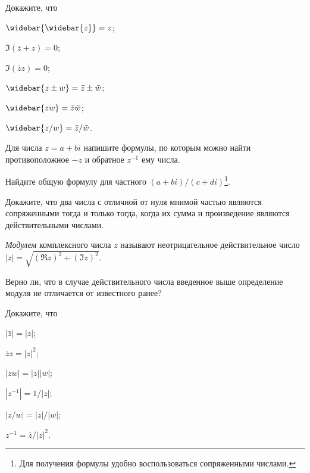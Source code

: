\documentclass[a4paper, 12pt, num=21, date=02.09.2019]{listok}
\begin{document}
\begin{problem}
	Докажите, что
	\begin{multienum}{3}
		\item \( \widebar{\widebar{z}}  = z\);
		\item \( \Im(\bar z + z) = 0\);
		\item \( \Im(\bar zz) = 0\);
		\item \( \widebar{ z \pm w} = \bar z \pm \bar w\);
		\item \( \widebar{zw} = \bar z \bar w \);
		\item \( \widebar{z/w} = \bar z/ \bar w\).
	\end{multienum}
\end{problem}
\begin{problem}
	Для числа $z = a + bi$ напишите формулы, по которым можно найти противоположное $-z$ и обратное $z^{-1}$ ему числа.
\end{problem}
\begin{problem}
	Найдите общую формулу для частного $(a + bi)/(c + di)$\footnote{Для получения формулы удобно воспользоваться сопряженными числами.}.
\end{problem}
\begin{problem}
	Докажите, что два числа с отличной от нуля мнимой частью являются сопряженными
	тогда и только тогда, когда их сумма и произведение являются действительными числами.
\end{problem}
\begin{definition}
	\textit{Модулем} комплексного числа $z$ называют неотрицательное действительное число $|z| = \sqrt{{(\Re z)}^2 + {(\Im z)}^2}$.
\end{definition}
\begin{problem}
	Верно ли, что в случае действительного числа введенное выше определение модуля не отличается от известного ранее?
\end{problem}
\begin{problem}
	Докажите, что
	\begin{multienum}{3}
		\item $|\bar z| = |z|$;
		\item $\bar zz = |z|^2$;
		\item $|zw| = |z||w|$;
		\item $|z^{-1}| = 1/|z|$;
		\item $|z/w| = |z|/|w|$;
		\item $z^{-1} = \bar z/|z|^2$.
	\end{multienum}
\end{problem}
\end{document}
